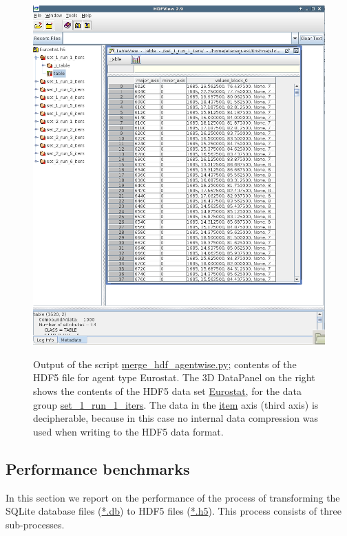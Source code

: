 \documentclass[10pt,a4paper]{article}
\begin{document}
\begin{figure}[htb!]
\centering\leavevmode
\graphicspath{{./hdf5_snapshots/}}
%
\centering\leavevmode
\includegraphics[scale=.4]{Fig_3_hdf5_file_per_agent_showing_values.png} 
\label{Fig: h5 per agent contents}
\caption{\footnotesize Output of the script \url{merge_hdf_agentwise.py}; contents of the HDF5 file for agent type Eurostat. The 3D DataPanel on the right shows the contents of the HDF5 data set \url{Eurostat}, for the data group  \url{set_1_run_1_iters}. The data in the \url{item} axis (third axis) is decipherable, because in this case no internal data compression was used when writing to the HDF5 data format.}
\end{figure}


\subsection{Performance benchmarks}

In this section we report on the performance of the process of transforming the SQLite database files (\url{*.db}) to HDF5 files (\url{*.h5}).
This process consists of three sub-processes. 
\end{document}
